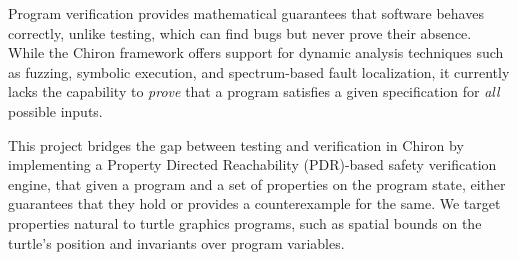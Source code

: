 Program verification provides mathematical guarantees that software behaves correctly, unlike testing, which can find bugs but never prove their absence. While the Chiron framework offers support for dynamic analysis techniques such as fuzzing, symbolic execution, and spectrum-based fault localization, it currently lacks the capability to \textit{prove} that a program satisfies a given specification for \textit{all} possible inputs.

This project bridges the gap between testing and verification in Chiron by implementing a Property Directed Reachability (PDR)-based safety verification engine, that given a program and a set of properties on the program state, either guarantees that they hold or provides a counterexample for the same. We target properties natural to turtle graphics programs, such as spatial bounds on the turtle's position and invariants over program variables.